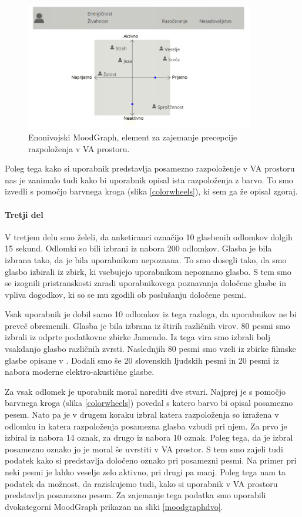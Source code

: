 \documentclass[a4paper, 12pt]{book}
\begin{document}
{\begin{figure}[ht]
\centering
\includegraphics[width=10cm]{images/enomoodgraph.png}

\caption{Enonivojski MoodGraph, element za zajemanje precepcije razpoloženja v VA prostoru. }
\label{moodgraph}
\end{figure}

Poleg tega kako si uporabnik predstavlja posamezno razpoloženje v VA prostoru nas je zanimalo tudi kako bi uporabnik opisal ista razpoloženja z barvo. To smo izvedli s pomočjo barvnega kroga (slika \ref{colorwheels}), ki sem ga že opisal zgoraj. 

\paragraph{Tretji del}

V tretjem delu smo želeli, da anketiranci označijo 10 glasbenih odlomkov dolgih 15 sekund. Odlomki so bili izbrani iz nabora 200 odlomkov. Glasba je bila izbrana tako, da je bila uporabnikom nepoznana. To smo dosegli tako, da smo glasbo izbirali iz zbirk, ki vsebujejo uporabnikom nepoznano glasbo. S tem smo se izognili pristranskosti zaradi uporabnikovega poznavanja določene glasbe in vpliva dogodkov, ki so se mu zgodili ob poslušanju določene pesmi. 

Vsak uporabnik je dobil samo 10 odlomkov iz tega razloga, da uporabnikov ne bi preveč obremenili. Glasba je bila izbrana iz štirih različnih virov. 80 pesmi smo izbrali iz odprte podatkovne zbirke Jamendo. Iz tega vira smo izbrali bolj vsakdanjo glasbo različnih zvrsti. Naslednjih 80 pesmi smo vzeli iz zbirke filmske glasbe opisane v \cite{eerola2010comparison}. Dodali smo še 20 slovenskih ljudskih pesmi in 20 pesmi iz nabora moderne elektro-akustične glasbe. 

Za vsak odlomek je uporabnik moral narediti dve stvari. Najprej je s pomočjo barvnega kroga (slika \ref{colorwheels}) povedal s katero barvo bi opisal posamezno pesem. Nato pa je v drugem koraku izbral katera razpoloženja so izražena v odlomku in katera razpoloženja posamezna glasba vzbudi pri njem. Za prvo je izbiral iz nabora 14 oznak, za drugo iz nabora 10 oznak. Poleg tega, da je izbral posamezno oznako jo je moral še uvrstiti v VA prostor. S tem smo zajeli tudi podatek kako si predstavlja določeno oznako pri posamezni pesmi. Na primer pri neki pesmi je lahko veselje zelo aktivno, pri drugi pa manj. Poleg tega nam ta podatek da možnost, da raziskujemo tudi, kako si uporabnik v VA prostoru predstavlja posamezno pesem. Za zajemanje tega podatka smo uporabili dvokategorni MoodGraph prikazan na sliki \ref{moodgraphdvo}.

}
\end{document}

